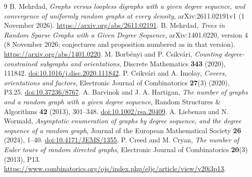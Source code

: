 \documentclass[11pt]{article}
\theoremstyle{remark}\newtheorem{remark}[theorem]{Remark}
\begin{document}
\begin{thebibliography}{9}\small\setlength{\itemsep}{2pt}
 B. Mehrdad, \emph{Graphs versus loopless digraphs with a given degree sequence, and convergence of uniformly random graphs at every density}, arXiv:2611.02191v1 (1 November 2026). \url{https://arxiv.org/abs/2611.02191}.
 B. Mehrdad, \emph{Trees in Random Sparse Graphs with a Given Degree Sequence}, arXiv:1401.0220, version 4 (8 November 2026; conjectures and proposition numbered as in that version). \url{https://arxiv.org/abs/1401.0220}.
 M. Borb\'enyi and P. Csikv\'ari, \emph{Counting degree-constrained subgraphs and orientations}, Discrete Mathematics \textbf{343} (2020), 111842. \href{https://doi.org/10.1016/j.disc.2020.111842}{doi:10.1016/j.disc.2020.111842}.
 P. Csikv\'ari and A. Imolay, \emph{Covers, orientations and factors}, Electronic Journal of Combinatorics \textbf{27}(3) (2020), P3.25. \href{https://doi.org/10.37236/8767}{doi:10.37236/8767}.
 A. Barvinok and J. A. Hartigan, \emph{The number of graphs and a random graph with a given degree sequence}, Random Structures \& Algorithms \textbf{42} (2013), 301--348. \href{https://doi.org/10.1002/rsa.20409}{doi:10.1002/rsa.20409}.
 A. Liebenau and N. Wormald, \emph{Asymptotic enumeration of graphs by degree sequence, and the degree sequence of a random graph}, Journal of the European Mathematical Society \textbf{26} (2024), 1--40. \href{https://doi.org/10.4171/JEMS/1355}{doi:10.4171/JEMS/1355}.
 P. Creed and M. Cryan, \emph{The number of Euler tours of random directed graphs}, Electronic Journal of Combinatorics \textbf{20}(3) (2013), P13. \url{https://www.combinatorics.org/ojs/index.php/eljc/article/view/v20i3p13}.
\end{thebibliography}
\end{document}
